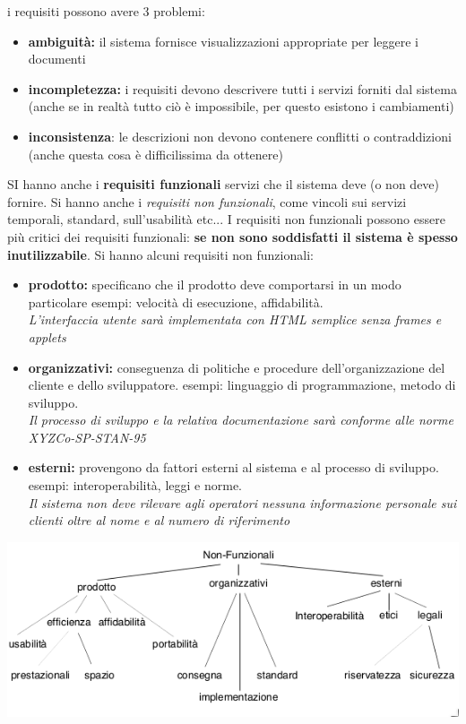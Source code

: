 \documentclass[a4paper,12pt, oneside]{book}
\begin{document}
i requisiti possono avere 3 problemi:
\begin{itemize}
	\item \textbf{ambiguità:} il sistema fornisce visualizzazioni appropriate per leggere i documenti
	\item \textbf{incompletezza:} i requisiti devono descrivere tutti i	servizi forniti dal sistema (anche se in realtà tutto ciò è impossibile, per questo esistono i cambiamenti)
	\item \textbf{inconsistenza}: le descrizioni non devono contenere conflitti o contraddizioni (anche questa cosa è difficilissima da ottenere)
\end{itemize}
SI hanno anche i \textbf{requisiti funzionali} servizi che il sistema deve (o non deve) fornire. Si hanno anche i \textit{requisiti non funzionali}, come vincoli sui servizi temporali, standard, sull'usabilità etc... I requisiti non funzionali possono essere più critici dei requisiti funzionali: \textbf{se non sono soddisfatti il sistema è spesso inutilizzabile}. Si hanno alcuni requisiti non funzionali:
\begin{itemize}
	\item \textbf{prodotto: }specificano che il prodotto deve comportarsi in un modo particolare
	      esempi: velocità di esecuzione, affidabilità.\\
	      \textit{L’interfaccia utente sarà implementata con HTML semplice senza frames
		      e applets}
	\item \textbf{organizzativi: }conseguenza di politiche e procedure dell’organizzazione del cliente e dello sviluppatore.
	      esempi: linguaggio di programmazione, metodo di sviluppo.\\
	      \textit{Il processo di sviluppo e la relativa documentazione sarà conforme alle
		      norme XYZCo-SP-STAN-95}
	\item \textbf{esterni: }provengono da fattori esterni al sistema e al processo di sviluppo.
	      esempi: interoperabilità, leggi e norme.
	      \\ \textit{Il sistema non deve rilevare agli operatori nessuna informazione
		      personale sui clienti oltre al nome e al numero di riferimento}
\end{itemize}
\begin{center}
	\includegraphics[scale=0.8]{img/req.png}
\end{center}
\end{document}
